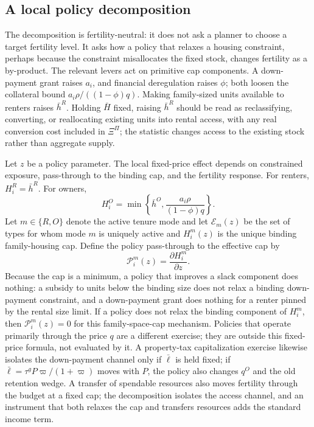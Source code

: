 \documentclass[11pt]{article}
\newcommand{\1}{\mathbf 1}
\begin{document}
\subsection{A local policy decomposition}

The decomposition is fertility-neutral: it does not ask a planner to choose a target fertility level. It asks how a policy that relaxes a housing constraint, perhaps because the constraint misallocates the fixed stock, changes fertility as a by-product. The relevant levers act on primitive cap components. A down-payment grant raises $a_i$, and financial deregulation raises $\phi$; both loosen the collateral bound $a_i\rho/((1-\phi)q)$. Making family-sized units available to renters raises $\bar h^R$. Holding $\bar H$ fixed, raising $\bar h^R$ should be read as reclassifying, converting, or reallocating existing units into rental access, with any real conversion cost included in $\Xi^\Pi$; the statistic changes access to the existing stock rather than aggregate supply.

Let $z$ be a policy parameter. The local fixed-price effect depends on constrained exposure, pass-through to the binding cap, and the fertility response. For renters, $H_i^R=\bar h^R$. For owners,
\[
H_i^O
=
\min\left\{
\bar h^O,
\frac{a_i\rho}{(1-\phi)q}
\right\}.
\]
Let $m\in\{R,O\}$ denote the active tenure mode and let $\mathcal E_m(z)$ be the set of types for whom mode $m$ is uniquely active and $H_i^m(z)$ is the unique binding family-housing cap. Define the policy pass-through to the effective cap by
\[
\mathcal P_i^m(z)=\frac{\partial H_i^m}{\partial z}.
\]
Because the cap is a minimum, a policy that improves a slack component does nothing: a subsidy to units below the binding size does not relax a binding down-payment constraint, and a down-payment grant does nothing for a renter pinned by the rental size limit. If a policy does not relax the binding component of $H_i^m$, then $\mathcal P_i^m(z)=0$ for this family-space-cap mechanism. Policies that operate primarily through the price $q$ are a different exercise; they are outside this fixed-price formula, not evaluated by it. A property-tax capitalization exercise likewise isolates the down-payment channel only if $\bar\ell$ is held fixed; if $\bar\ell=\tau^gP\varpi/(1+\varpi)$ moves with $P$, the policy also changes $q^O$ and the old retention wedge. A transfer of spendable resources also moves fertility through the budget at a fixed cap; the decomposition isolates the access channel, and an instrument that both relaxes the cap and transfers resources adds the standard income term.
\end{document}
